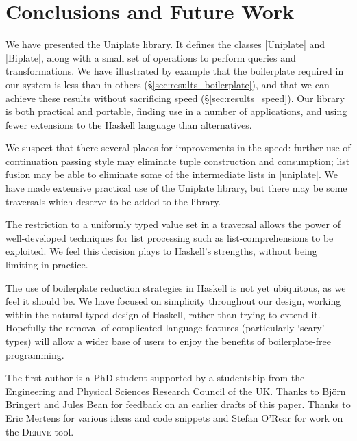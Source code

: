 \documentclass[preprint]{sigplanconf}
\newcommand{\derive}{\textsc{Derive}}
\begin{document}
\section{Conclusions and Future Work}
\label{sec:conclusion}

We have presented the Uniplate library. It defines the classes |Uniplate| and |Biplate|, along with a small set of operations to perform queries and transformations. We have illustrated by example that the boilerplate required in our system is less than in others (\S\ref{sec:results_boilerplate}), and that we can achieve these results without sacrificing speed (\S\ref{sec:results_speed}). Our library is both practical and portable, finding use in a number of applications, and using fewer extensions to the Haskell language than alternatives.

We suspect that there several places for improvements in the speed: further use of continuation passing style may eliminate tuple construction and consumption; list fusion may be able to eliminate some of the intermediate lists in |uniplate|. We have made extensive practical use of the Uniplate library, but there may be some traversals which deserve to be added to the library.

The restriction to a uniformly typed value set in a traversal allows the power of well-developed techniques for list processing such as list-comprehensions to be exploited. We feel this decision plays to Haskell's strengths, without being limiting in practice.

The use of boilerplate reduction strategies in Haskell is not yet ubiquitous, as we feel it should be. We have focused on simplicity throughout our design, working within the natural typed design of Haskell, rather than trying to extend it. Hopefully the removal of complicated language features (particularly `scary' types) will allow a wider base of users to enjoy the benefits of boilerplate-free programming.


\acks

The first author is a PhD student supported by a studentship from the Engineering and Physical Sciences Research Council of the UK. Thanks to Bj\"{o}rn Bringert and Jules Bean for feedback on an earlier drafts of this paper. Thanks to Eric Mertens for various ideas and code snippets and Stefan O'Rear for work on the \derive{} tool.



\end{document}
